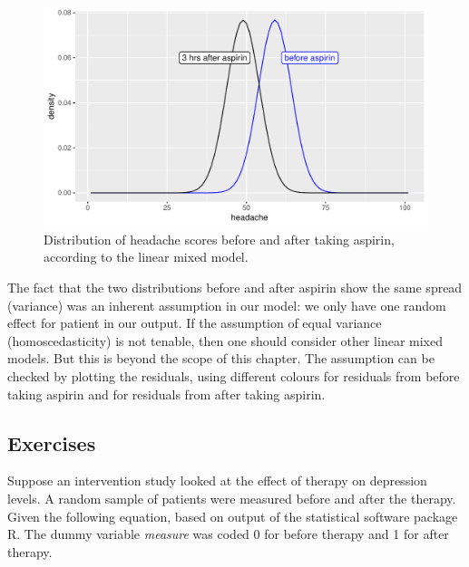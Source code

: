 \documentclass[]{report}\usepackage[]{graphicx}\usepackage[]{color}
\makeatletter
\def\maxwidth{ %
  \ifdim\Gin@nat@width>\linewidth
    \linewidth
  \else
    \Gin@nat@width
  \fi
}
\newenvironment{knitrout}{}{} %
\makeatother
\begin{document}
\begin{knitrout}
\color{fgcolor}\begin{figure}

{\centering \includegraphics[width=\maxwidth]{figure/resultsanalysisprepost2-1} 

}

\caption[Distribution of headache scores before and after taking aspirin, according to the linear mixed model]{Distribution of headache scores before and after taking aspirin, according to the linear mixed model.}\label{fig:resultsanalysisprepost2}
\end{figure}


\end{knitrout}



The fact that the two distributions before and after aspirin show the same spread (variance) was an inherent assumption in our model: we only have one random effect for patient in our output. If the assumption of equal variance (homoscedasticity) is not tenable, then one should consider other linear mixed models. But this is beyond the scope of this chapter. The assumption can be checked by plotting the residuals, using different colours for residuals from before taking aspirin and for residuals from after taking aspirin. 



\subsection{Exercises}

Suppose an intervention study looked at the effect of therapy on depression levels. A random sample of patients were measured before and after the therapy. Given the following equation, based on output of the statistical software package R. The dummy variable \textit{measure} was coded 0 for before therapy and 1 for after therapy.
\end{document}
